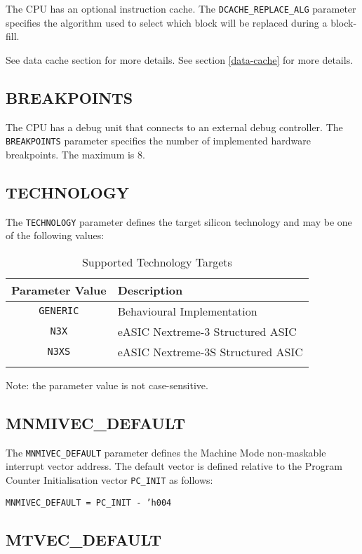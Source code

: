 The CPU has an optional instruction cache. The \texttt{DCACHE\_REPLACE\_ALG}
parameter specifies the algorithm used to select which block will be
replaced during a block-fill.

\ifdefined\MARKDOWN
See data cache section for more details.
\else
See section \ref{data-cache}  for more details.
\fi

\subsection{BREAKPOINTS}\label{breakpoints}

The CPU has a debug unit that connects to an external debug controller.
The \texttt{BREAKPOINTS} parameter specifies the number of implemented hardware
breakpoints. The maximum is 8.

\subsection{TECHNOLOGY}\label{technology}

The \texttt{TECHNOLOGY} parameter defines the target silicon technology and may
be one of the following values:

\begin{longtable}[]{@{}cl@{}}
\toprule
Parameter Value & Description\tabularnewline
\midrule
\endhead
\texttt{GENERIC} & Behavioural Implementation\tabularnewline
\texttt{N3X} & eASIC Nextreme-3 Structured ASIC\tabularnewline
\texttt{N3XS} & eASIC Nextreme-3S Structured ASIC\tabularnewline
\bottomrule
\caption{Supported Technology Targets}
\label{tab:supported-tech-targets}

\end{longtable}

Note: the parameter value is not case-sensitive.

\subsection{MNMIVEC\_DEFAULT}\label{mnmivec_default}

The \texttt{MNMIVEC\_DEFAULT} parameter defines the Machine Mode non-maskable
interrupt vector address. The default vector is defined relative to the
Program Counter Initialisation vector \texttt{PC\_INIT} as follows:

\texttt{MNMIVEC\_DEFAULT = PC\_INIT - 'h004}

\subsection{MTVEC\_DEFAULT}\label{mtvec_default}

